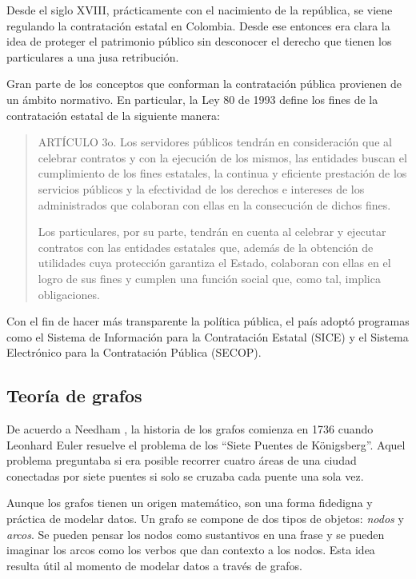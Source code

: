 \documentclass[11pt,letterpaper,oneside]{article}
\begin{document}
Desde el siglo XVIII, prácticamente con el nacimiento de la república, se viene regulando la contratación estatal en Colombia. Desde ese entonces era clara la idea de proteger el patrimonio público sin desconocer el derecho que tienen los particulares a una jusa retribución.

Gran parte de los conceptos que conforman la contratación pública provienen de un ámbito normativo. En particular, la Ley 80 de 1993 \cite{Ley-80}  define los fines de la contratación estatal de la siguiente manera:

\begin{quote}
ARTÍCULO 3o. Los servidores públicos tendrán en consideración que al celebrar contratos y con la ejecución de los mismos, las entidades buscan el cumplimiento de los fines estatales, la continua y eficiente prestación de los servicios públicos y la efectividad de los derechos e intereses de los administrados que colaboran con ellas en la consecución de dichos fines.

Los particulares, por su parte, tendrán en cuenta al celebrar y ejecutar contratos con las entidades estatales que, además de la obtención de utilidades cuya protección garantiza el Estado, colaboran con ellas en el logro de sus fines y cumplen una función social que, como tal, implica obligaciones.
\end{quote}

Con el fin de hacer más transparente la política pública, el país adoptó programas como el Sistema de Información para la Contratación Estatal (SICE) y el Sistema Electrónico para la Contratación Pública (SECOP).

\subsection{Teoría de grafos}
De acuerdo a Needham \cite{Needham-2019}, la historia de los grafos comienza en 1736 cuando Leonhard Euler resuelve el problema de los ``Siete Puentes de K\"{o}nigsberg''. Aquel problema preguntaba si era posible recorrer cuatro áreas de una ciudad conectadas por siete puentes si solo se cruzaba cada puente una sola vez.

Aunque los grafos tienen un origen matemático, son una forma fidedigna y práctica de modelar datos. Un grafo se compone de dos tipos de objetos: \textit{nodos} y \textit{arcos}. Se pueden pensar los nodos como sustantivos en una frase y se pueden imaginar los arcos como los verbos que dan contexto a los nodos. Esta idea resulta útil al momento de modelar datos a través de grafos.
\end{document}
